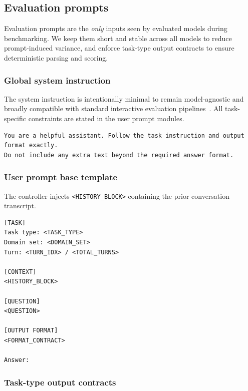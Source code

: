 \subsection{Evaluation prompts}
\label{app:prompts_evaluation}

Evaluation prompts are the \emph{only} inputs seen by evaluated models during benchmarking.
We keep them short and stable across all models to reduce prompt-induced variance, and enforce task-type output contracts to ensure deterministic parsing and scoring.

\subsubsection{Global system instruction}
\label{app:prompts_system}

The system instruction is intentionally minimal to remain model-agnostic and broadly compatible with standard interactive evaluation pipelines~\citep{liang2022helm,liu2023agentbench,zhou2024webarena}.
All task-specific constraints are stated in the user prompt modules.
\\
\begin{lstlisting}[frame=single]
You are a helpful assistant. Follow the task instruction and output format exactly.
Do not include any extra text beyond the required answer format.
\end{lstlisting}

\subsubsection{User prompt base template}
\label{app:prompts_user_base}

The controller injects \texttt{<HISTORY\_BLOCK>} containing the prior conversation transcript.
\\
\begin{lstlisting}[frame=single]
[TASK]
Task type: <TASK_TYPE>
Domain set: <DOMAIN_SET>
Turn: <TURN_IDX> / <TOTAL_TURNS>

[CONTEXT]
<HISTORY_BLOCK>

[QUESTION]
<QUESTION>

[OUTPUT FORMAT]
<FORMAT_CONTRACT>

Answer:
\end{lstlisting}

\subsubsection{Task-type output contracts}
\label{app:prompts_contracts}

